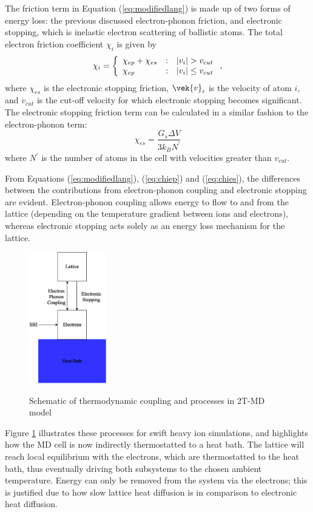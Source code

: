 The friction term in Equation (\ref{eq:modifiedlang}) is made up of two 
forms of energy loss: the previous discussed electron-phonon friction, 
and electronic stopping, which is inelastic electron scattering of ballistic 
atoms. The total electron friction coefficient $\chi_i$ is given by
\begin{equation}
\chi_{i} = \left\{ \begin{array} {l@{\quad:\quad}l}
\chi_{ep} + \chi_{es} & | v_i | > v_{cut} \\
\chi_{ep} & | v_i | \le v_{cut}
\end{array} \right. ,
\end{equation}
where $\chi_{es}$ is the electronic stopping friction, $\vek{v}_{i}$ is 
the velocity of atom $i$, and $v_{cut}$ is the cut-off velocity for which 
electronic stopping becomes significant. The electronic stopping 
friction term can be calculated in a similar fashion to the electron-phonon 
term:
\begin{equation} \label{eq:chies}
\chi_{es} = \frac{G_{s} \Delta V}{3 k_B N^{\prime}}
\end{equation}
where $N^{\prime}$ is the number of atoms in the cell with velocities 
greater than $v_{cut}$.

From Equations (\ref{eq:modifiedlang}), (\ref{eq:chiep}) and (\ref{eq:chies}), 
the differences between the contributions from electron-phonon coupling 
and electronic stopping are evident. Electron-phonon coupling allows energy 
to flow to and from the lattice (depending on the temperature gradient between 
ions and electrons), whereas electronic stopping acts solely as an energy 
loss mechanism for the lattice.
\begin{figure}[ht] 
	\centering
	{
		\includegraphics[width=0.3\textwidth]{ttmheatbath}
	}
	\caption{Schematic of thermodynamic coupling and processes in 2T-MD model}
	\label{fig:heatbath}
\end{figure}
Figure \ref{fig:heatbath} illustrates these processes for swift heavy ion 
simulations, and highlights how the MD cell is now indirectly thermostatted 
to a heat bath. The lattice will reach local equilibrium with the electrons, 
which are thermostatted to the heat bath, thus eventually driving both 
subsystems to the chosen ambient temperature. Energy can only be 
removed from the system via the electrons; this is justified due to how 
slow lattice heat diffusion is in comparison to electronic heat diffusion.

